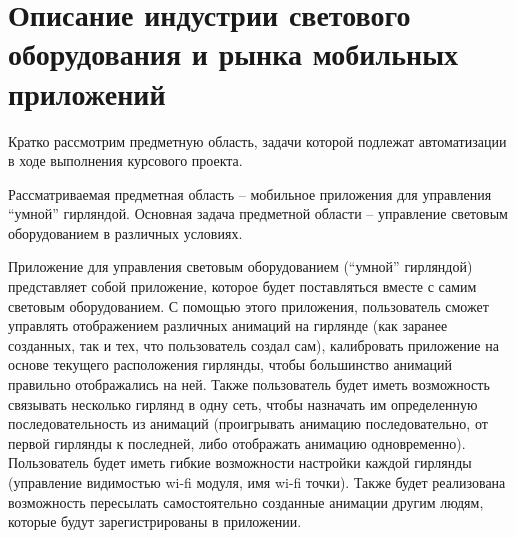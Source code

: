 \section{Описание индустрии светового оборудования и рынка мобильных приложений}
\label{sec:subject}

Кратко рассмотрим предметную область, задачи которой подлежат автоматизации в ходе выполнения курсового проекта.

Рассматриваемая предметная область – мобильное приложения для управления ``умной'' гирляндой. Основная задача предметной области – управление световым оборудованием в различных условиях.

Приложение для управления световым оборудованием (``умной'' гирляндой) представляет собой приложение, которое будет поставляться вместе с самим световым оборудованием. С помощью этого приложения, пользователь сможет управлять отображением различных анимаций на гирлянде (как заранее созданных, так и тех, что пользователь создал сам), калибровать приложение на основе текущего расположения гирлянды, чтобы большинство анимаций правильно отображались на ней. Также пользователь будет иметь возможность связывать несколько гирлянд в одну сеть, чтобы назначать им определенную последовательность из анимаций (проигрывать анимацию последовательно, от первой гирлянды к последней, либо отображать анимацию одновременно). Пользователь будет иметь гибкие возможности настройки каждой гирлянды (управление видимостью wi-fi модуля, имя wi-fi точки). Также будет реализована возможность пересылать самостоятельно созданные анимации другим людям, которые будут зарегистрированы в приложении.






